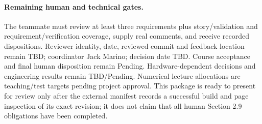 \paragraph{Remaining human and technical gates.}
The teammate must review at least three requirements plus story/validation
and requirement/verification coverage, supply real comments, and receive
recorded dispositions. Reviewer identity, date, reviewed commit and feedback
location remain TBD; coordinator Jack Marino; decision date TBD. Course
acceptance and final human disposition remain Pending. Hardware-dependent
decisions and engineering results remain TBD/Pending. Numerical lecture
allocations are teaching/test targets pending project approval. This package
is ready to present for review only after the external manifest records a
successful build and page inspection of its exact revision; it does not
claim that all human Section 2.9 obligations have been completed.
